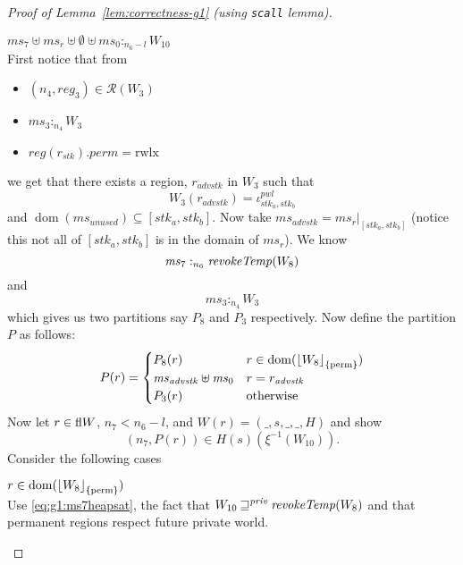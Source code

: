 \documentclass[a4paper]{article}
\DeclarePairedDelimiter\floor{\lfloor}{\rfloor}
\DeclareMathOperator{\dom}{dom}
\newcommand{\var}[1]{\mathit{#1}}
\newcommand{\hs}{\var{ms}}
\newcommand{\ms}{\hs}
\newcommand{\reg}{\var{reg}}
\newcommand{\heap}{\var{mem}}
\newcommand{\perm}{\var{perm}}
\newcommand{\adv}{\var{adv}}
\newcommand{\stk}{\var{stk}}
\newcommand{\pwl}{\var{pwl}}
\newcommand{\unused}{\var{unused}}
\newcommand{\plainfun}[2]{
  \ifthenelse{\equal{#2}{}}
  {\mathit{#1}}
  {\mathit{#1}(#2)}
}
\newcommand{\revokeTemp}[1]{\plainfun{revokeTemp}{#1}}
\newcommand{\erase}[2]{\floor*{#1}_{\{#2\}}}
\newcommand{\futurestr}{\mathbin{\sqsupseteq}^{\var{priv}}}
\newcommand{\heapSat}[3][\heap]{#1 :_{#2} #3}
\newcommand{\memSat}[3][n]{\heapSat[#2]{#1}{#3}}
\newcommand{\asmType}{\plaindom{AsmType}}
\newcommand{\plaindom}[1]{\mathrm{#1}}
\newcommand{\intr}[2]{\mathcal{#1}}
\newcommand{\regintr}[1]{\intr{R}{#1}}
\newcommand{\stdrr}{\regintr{\asmType}}
\newcommand{\npair}[2][n]{\left(#1,#2 \right)}
\newcommand{\plainperm}[1]{\mathrm{#1}}
\newcommand{\rwlx}{\plainperm{rwlx}}
\newcommand{\plainview}[1]{\mathrm{#1}}
\newcommand{\perma}{\plainview{perm}}
\begin{document}
\begin{proof}[Proof of Lemma~\ref{lem:correctness-g1} (using \texttt{scall} lemma)]
\begin{enumproof}[resume]
\begin{enumproof}
\begin{enumproof}
            \item $\memSat[n_6-l]{\ms_7 \uplus \ms_r \uplus \emptyset \uplus \ms_0}{W_{10}}$ \label{g1:memsatw10}\\
              First notice that from %
              \begin{itemize}
              \item $\npair[n_4]{\reg_3} \in \stdrr(W_3)$
              \item $\memSat[n_4]{\ms_3}{W_3}$
              \item $\reg(r_\stk).\perm = \rwlx$
              \end{itemize}
              we get that there exists a region, $r_{\adv \stk}$ in $W_3$ such that
              \[
                W_3(r_{\adv \stk}) = \iota_{\stk_a,\stk_b}^\pwl
              \]
              and $\dom(\ms_\unused) \subseteq [\stk_a,\stk_b]$. Now take $\ms_{\adv \stk} = \ms_r|_{[\stk_a,\stk_b]}$ (notice this not all of $[\stk_a,\stk_b]$ is in the domain of $\ms_r$).
              We know
              \begin{equation}
                \label{eq:g1:ms7heapsat}
                \memSat[n_6]{\ms_7}{\revokeTemp{W_8}}
              \end{equation}
              and
              \begin{equation}
                \label{eq:g1:ms3heapsat}
                \memSat[n_4]{\ms_3}{W_3}
              \end{equation}
              which gives us two partitions say $P_8$ and $P_3$ respectively. Now define the partition $P$ as follows:
              \[
                P(r) =
                \begin{cases}
                  P_8(r) & r \in \dom(\erase{W_8}{\perma}) \\
                  \ms_{\adv \stk} \uplus \ms_0 & r = r_{\adv \stk}\\
                  P_3(r) & \text{otherwise}
                \end{cases}
              \]
              Now let $r \in \active{W}$, $n_7 < n_6 - l$, and $W(r) = (\_,s,\_,\_,H)$ and show
              \[
                \npair[n_7]{P(r)} \in H(s)(\xi^{-1}(W_{10})).
              \]
              Consider the following cases
              \begin{enumproof}
                \item $r \in \dom(\erase{W_8}{\perma})$ \\
                  Use \ref{eq:g1:ms7heapsat}, the fact that $W_{10} \futurestr \revokeTemp{W_8}$ and that permanent regions respect future private world.

\end{enumproof}
\end{enumproof}
\end{enumproof}
\end{enumproof}
\end{proof}
\end{document}
